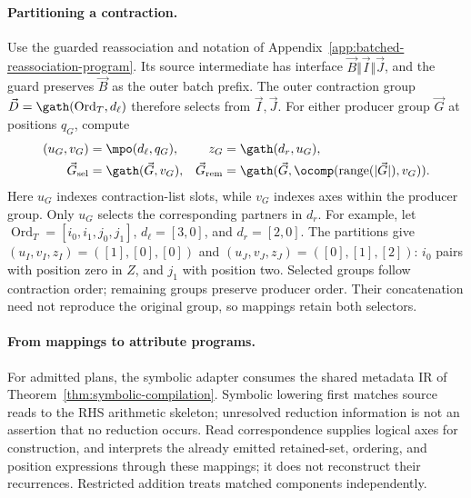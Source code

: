 \paragraph{Partitioning a contraction.}
\label{extended:sec:partitioning}
Use the guarded reassociation and notation of
Appendix~\ref{app:batched-reassociation-program}. Its source intermediate has
interface $\vec B\Vert\vec I\Vert\vec J$, and the guard preserves
$\vec B$ as the outer batch prefix. The outer contraction group
$\vec D=\gath(\operatorname{Ord}_T,d_\ell)$ therefore selects from $\vec I,\vec J$.
For either producer group $\vec G$ at positions $q_G$, compute
\begin{equation}
\begin{aligned}
 (u_G,v_G)&=\mpo(d_\ell,q_G),&
 z_G&=\gath(d_r,u_G),\\
 \vec G_{\mathrm{sel}}&=\gath(\vec G,v_G),&
 \vec G_{\mathrm{rem}}&=\gath(\vec G,\ocomp(\operatorname{range}(|\vec G|),v_G)).
\end{aligned}
 \label{extended:eq:z-partners}
\end{equation}
Here $u_G$ indexes contraction-list slots, while $v_G$ indexes axes
within the producer group. Only $u_G$ selects the corresponding partners
in $d_r$. For example, let $\operatorname{Ord}_T=[i_0,i_1,j_0,j_1]$,
$d_\ell=[3,0]$, and $d_r=[2,0]$. The partitions give
$(u_I,v_I,z_I)=([1],[0],[0])$ and
$(u_J,v_J,z_J)=([0],[1],[2])$: $i_0$ pairs with position zero in $Z$,
and $j_1$ with position two. Selected groups follow contraction order;
remaining groups preserve producer order. Their concatenation need not
reproduce the original group, so mappings retain both selectors.

\paragraph{From mappings to attribute programs.}
\label{app:mappings-to-attribute-programs}
For admitted plans, the symbolic adapter consumes the shared metadata IR
of Theorem~\ref{thm:symbolic-compilation}. Symbolic lowering first matches source reads to
the RHS arithmetic skeleton; unresolved reduction information is not an
assertion that no reduction occurs. Read correspondence supplies logical
axes for construction, and interprets the already emitted retained-set, ordering, and position
expressions through these mappings; it does not reconstruct their recurrences.
Restricted addition treats matched components independently.

